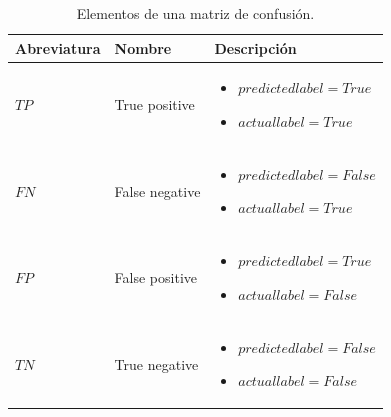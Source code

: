 \begin{table}[H]
    \caption{Elementos de una matriz de confusión.}
    \small
    \begin{tabular}{llp{}}
        \hline
        \textbf{Abreviatura} & \textbf{Nombre} & \textbf{Descripción}         \\ \hline
        $ TP $               & True positive   & \begin{itemize}
                                                     \item $predicted label=True$
                                                     \item $actual label=True$
                                                 \end{itemize}  \\ \hline
        $ FN $               & False negative  & \begin{itemize}
                                                     \item $predicted label=False$
                                                     \item $actual label=True$
                                                 \end{itemize} \\ \hline
        $ FP $               & False positive  & \begin{itemize}
                                                     \item $predicted label=True$
                                                     \item $actual label=False$
                                                 \end{itemize}  \\ \hline
        $ TN $               & True negative   & \begin{itemize}
                                                     \item $predicted label=False$
                                                     \item $actual label=False$
                                                 \end{itemize} \\ \hline
    \end{tabular}
    \begin{minipage}{\textwidth}
        \vspace{10pt}
        \label{tab:MatrizConfusion}
    \end{minipage}
\end{table}

